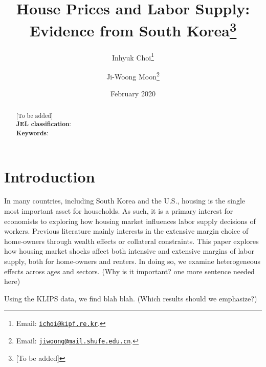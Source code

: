\documentclass[10pt]{article}
\title{House Prices and Labor Supply: Evidence from South Korea\thanks{[To be added]}}
\author{
    Inhyuk Choi\thanks{Email: \texttt{\href{mailto:ichoi@kipf.re.kr}{ichoi@kipf.re.kr}}.}
    \and
    Ji-Woong Moon\thanks{Email: \texttt{\href{mailto:jiwoong@mail.shufe.edu.cn}{jiwoong@mail.shufe.edu.cn}}.}
    }
\date{February 2020}
\theoremstyle{definition}
\theoremstyle{remark}
\begin{document}
\maketitle

\begin{abstract}
    [To be added] \\
    \textbf{JEL classification}: \\
    \textbf{Keywords}: 
\end{abstract}

\newpage

\section{Introduction}\label{sec:intro}
In many countries, including South Korea and the U.S., housing is the single most important asset for households. As such, it is a primary interest for economists to exploring how housing market influences labor supply decisions of workers. Previous literature mainly interests in the extensive margin choice of home-owners through wealth effects or collateral constraints. This paper explores how housing market shocks affect both intensive and extensive margins of labor supply, both for home-owners and renters. In doing so, we examine heterogeneous effects across ages and sectors. (Why is it important? one more sentence needed here)

Using the KLIPS data, we find blah blah. (Which results should we emphasize?)
\end{document}

